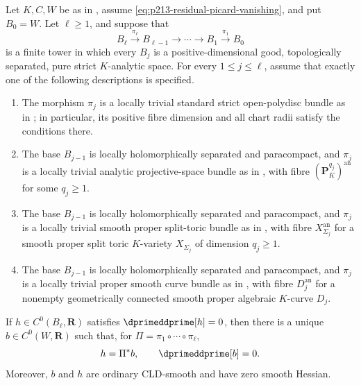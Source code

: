 \begin{theorem}
\label{thm:p213-residual-picard-mixed-tower}
Let \(K,C,W\) be as in
, assume
\eqref{eq:p213-residual-picard-vanishing}, and put \(B_0=W\).  Let
\(\ell\geq1\), and suppose that
\[
 B_\ell\xrightarrow{\pi_\ell}B_{\ell-1}
 \longrightarrow\cdots\longrightarrow B_1
 \xrightarrow{\pi_1}B_0
\]
is a finite tower in which every \(B_j\) is a positive-dimensional good,
topologically separated, pure strict \(K\)-analytic space.  For every
\(1\leq j\leq\ell\), assume that exactly one of the following descriptions
is specified.
\begin{enumerate}
\item The morphism \(\pi_j\) is a locally trivial standard strict
open-polydisc bundle as in
; in particular, its positive
fibre dimension and all chart radii satisfy the conditions there.
\item The base \(B_{j-1}\) is locally holomorphically separated and
paracompact, and \(\pi_j\) is a locally trivial analytic projective-space
bundle as in , with fibre
\((\mathbf P_K^{q_j})^{\mathrm{an}}\) for some \(q_j\geq1\).
\item The base $B_{j-1}$ is locally holomorphically separated and
paracompact, and $\pi_j$ is a locally trivial smooth proper split-toric
bundle as in
, with fibre
$X_{\Sigma_j}^{\mathrm{an}}$ for a smooth proper split toric $K$-variety
$X_{\Sigma_j}$ of dimension $q_j\geq1$.
\item The base \(B_{j-1}\) is locally holomorphically separated and
paracompact, and \(\pi_j\) is a locally trivial proper smooth curve bundle
as in , with fibre
\(D_j^{\mathrm{an}}\) for a nonempty geometrically connected smooth proper
algebraic \(K\)-curve \(D_j\).
\end{enumerate}
If \(h\in C^0(B_\ell,\mathbf R)\) satisfies
\(\dprimeddprime[h]=0\), then there is a unique
\(b\in C^0(W,\mathbf R)\) such that, for
\(\Pi=\pi_1\circ\cdots\circ\pi_\ell\),
\[
                  h=\Pi^*b,
                  \qquad \dprimeddprime[b]=0.
\]
Moreover, \(b\) and \(h\) are ordinary CLD-smooth and have zero smooth
Hessian.
\end{theorem}

